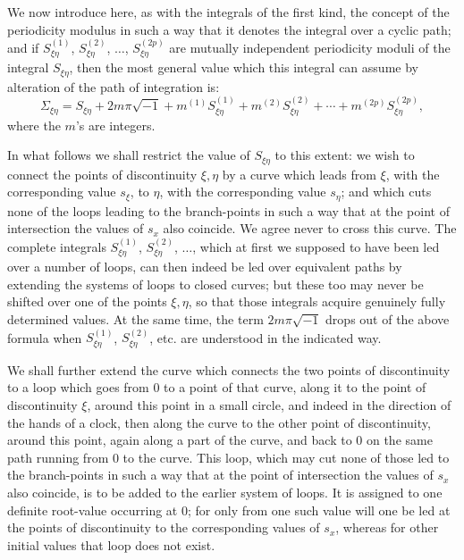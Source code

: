\documentclass[10pt]{article}
\begin{document}
We now introduce here, as with the integrals of the first kind, the concept of the periodicity modulus in such a way that it denotes the integral over a cyclic path; and if \(S_{\xi\eta}^{(1)}\), \(S_{\xi\eta}^{(2)}\), \(\ldots\), \(S_{\xi\eta}^{(2p)}\) are mutually independent periodicity moduli of the integral \(S_{\xi\eta}\), then the most general value which this integral can assume by alteration of the path of integration is:
\[
\Sigma_{\xi\eta}=S_{\xi\eta}+2m\pi\sqrt{-1}+m^{(1)}S_{\xi\eta}^{(1)}+m^{(2)}S_{\xi\eta}^{(2)}+\cdots+m^{(2p)}S_{\xi\eta}^{(2p)},
\]
where the \(m\)'s are integers.

In what follows we shall restrict the value of \(S_{\xi\eta}\) to this extent: we wish to connect the points of discontinuity \(\xi,\eta\) by a curve which leads from \(\xi\), with the corresponding value \(s_\xi\), to \(\eta\), with the corresponding value \(s_\eta\); and which cuts none of the loops leading to the branch-points in such a way that at the point of intersection the values of \(s_x\) also coincide. We agree never to cross this curve. The complete integrals \(S_{\xi\eta}^{(1)}\), \(S_{\xi\eta}^{(2)}\), \(\ldots\), which at first we supposed to have been led over a number of loops, can then indeed be led over equivalent paths by extending the systems of loops to closed curves; but these too may never be shifted over one of the points \(\xi,\eta\), so that those integrals acquire genuinely fully determined values. At the same time, the term \(2m\pi\sqrt{-1}\) drops out of the above formula when \(S_{\xi\eta}^{(1)}\), \(S_{\xi\eta}^{(2)}\), etc. are understood in the indicated way.

We shall further extend the curve which connects the two points of discontinuity to a loop which goes from \(0\) to a point of that curve, along it to the point of discontinuity \(\xi\), around this point in a small circle, and indeed in the direction of the hands of a clock, then along the curve to the other point of discontinuity, around this point, again along a part of the curve, and back to \(0\) on the same path running from \(0\) to the curve. This loop, which may cut none of those led to the branch-points in such a way that at the point of intersection the values of \(s_x\) also coincide, is to be added to the earlier system of loops. It is assigned to one definite root-value occurring at \(0\); for only from one such value will one be led at the points of discontinuity to the corresponding values of \(s_x\), whereas for other initial values that loop does not exist.
\end{document}
